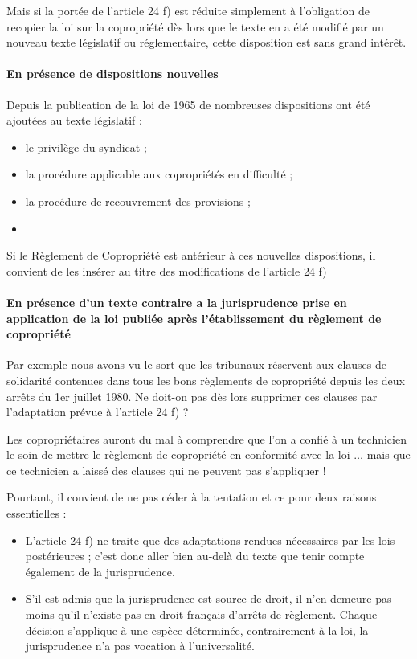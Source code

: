 				Mais si la portée de l’article 24 f) est réduite simplement à l’obligation de recopier la loi sur la copropriété dès lors que le texte en a été modifié par un nouveau texte législatif ou réglementaire, cette disposition est sans grand intérêt.
			
			\paragraph{En présence de dispositions nouvelles}
			
				Depuis la publication de la loi de 1965 de nombreuses dispositions ont été ajoutées au texte législatif :
				\begin{itemize}
					\item le privilège du syndicat ;
					\item la procédure applicable aux copropriétés en difficulté ;
					\item la procédure de recouvrement des provisions ;
					\item \etc
				\end{itemize}
			
				Si le Règlement de Copropriété est antérieur à ces nouvelles dispositions, il convient de les insérer au titre des modifications de l’article 24 f)
			
			\paragraph{En présence d’un texte contraire a la jurisprudence prise en application de la loi publiée après l’établissement du règlement de copropriété}

				Par exemple nous avons vu le sort que les tribunaux réservent aux clauses de solidarité contenues dans tous les bons règlements de copropriété depuis les deux arrêts du 1er juillet 1980. Ne doit-on pas dès lors supprimer ces clauses par l’adaptation prévue à l’article 24 f) ?
				
				Les copropriétaires auront du mal à comprendre que l’on a confié à un technicien le soin de mettre le règlement de copropriété en conformité avec la loi $\dots$ mais que ce technicien a laissé des clauses qui ne peuvent pas s’appliquer !
				
				Pourtant, il convient de ne pas céder à la tentation et ce pour deux raisons essentielles :
				\begin{itemize}
					\item L’article 24 f) ne traite que des adaptations rendues nécessaires par les lois postérieures ; c’est donc aller bien au-delà du texte que tenir compte également de la jurisprudence.
					\item S’il est admis que la jurisprudence est source de droit, il n’en demeure pas moins qu’il n’existe pas en droit français d’arrêts de règlement. Chaque décision s’applique à une espèce déterminée, contrairement à la loi, la jurisprudence n’a pas vocation à l’universalité.
				\end{itemize}
			
